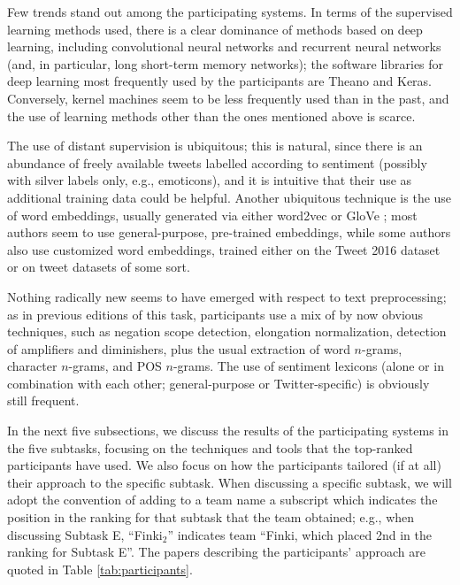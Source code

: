 \documentclass[11pt,letterpaper]{article}
\begin{document}
Few trends stand out among the participating systems. In terms of the
supervised learning methods used, there is a clear dominance of
methods based on deep learning, including convolutional neural
networks and recurrent neural networks (and, in particular, long
short-term memory networks); the software libraries for deep learning
most frequently used by the participants are Theano and
Keras. Conversely, kernel machines seem to be less frequently used
than in the past, and the use of learning methods other than the ones
mentioned above is scarce.

The use of distant supervision is ubiquitous; this is natural, since
there is an abundance of freely available tweets labelled according to
sentiment (possibly with silver labels only, e.g., emoticons), and it
is intuitive that their use as additional training data could be
helpful. Another ubiquitous technique is the use of word embeddings,
usually generated via either word2vec \cite{Mikolov:2013} or GloVe
\cite{pennington2014glove}; most authors seem to use general-purpose,
pre-trained embeddings, while some authors also use customized word
embeddings, trained either on the Tweet 2016 dataset or on tweet
datasets of some sort.

Nothing radically new seems to have emerged with respect to text
preprocessing; as in previous editions of this task, participants use
a mix of by now obvious techniques, such as negation scope detection,
elongation normalization, detection of amplifiers and diminishers,
plus the usual extraction of word $n$-grams, character $n$-grams, and
POS $n$-grams. The use of sentiment lexicons (alone or in combination
with each other; general-purpose or Twitter-specific) is obviously
still frequent.

In the next five subsections, we discuss the results of the
participating systems in the five subtasks, focusing on the techniques
and tools that the top-ranked participants have used. We also focus on
how the participants tailored (if at all) their approach to the
specific subtask. When discussing a specific subtask, we will adopt
the convention of adding to a team name a subscript which indicates
the position in the ranking for that subtask that the team obtained;
e.g., when discussing Subtask E, ``Finki$_{2}$'' indicates team
``Finki, which placed 2nd in the ranking for Subtask E''. The papers
describing the participants' approach are quoted in Table
\ref{tab:participants}.

\end{document}
